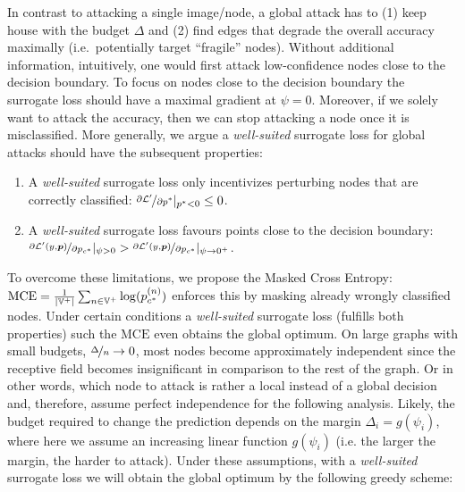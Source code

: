 \documentclass[sigconf, review]{acmart}
\begin{document}

In contrast to attacking a single image/node, a global attack has to (1) keep house with the budget \(\Delta\) and (2) find edges that degrade the overall accuracy maximally (i.e.\ potentially target ``fragile'' nodes). Without additional information, intuitively, one would first attack low-confidence nodes close to the decision boundary. To focus on nodes close to the decision boundary the surrogate loss should have a maximal gradient at \(\psi = 0\). Moreover, if we solely want to attack the accuracy, then we can stop attacking a node once it is misclassified. More generally, we argue a \emph{well-suited} surrogate loss for global attacks should have the subsequent properties:
\begin{enumerate}
    \item  A \emph{well-suited} surrogate loss only incentivizes perturbing nodes that are correctly classified: \(\nicefrac{\partial \mathcal{L}'}{\partial p^*} |_{p^* < 0} \le 0\).
    \item  A \emph{well-suited} surrogate loss favours points close to the decision boundary: \(\nicefrac{\partial \mathcal{L}'(y, {\bm{p}})}{\partial {p}_{c^*}} |_{\psi > 0}  > \nicefrac{\partial \mathcal{L}'(y, {\bm{p}})}{\partial {p}_{c^*}} |_{\psi \to 0^+}\).
\end{enumerate}

To overcome these limitations, we propose the Masked Cross Entropy: \(\text{MCE} = \frac{1}{|{\mathbb{V}}^+|} \sum_{n \in {\mathbb{V}}^+} \log({p}_{c^*}^{(n)})\) enforces this by masking already wrongly classified nodes.
Under certain conditions a \emph{well-suited} surrogate loss (fulfills both properties) such the \(\text{MCE}\) even obtains the global optimum. On large graphs with small budgets, \(\nicefrac{\Delta}{n} \to 0\), most nodes become approximately independent since the receptive field becomes insignificant in comparison to the rest of the graph. Or in other words, which node to attack is rather a local instead of a global decision and, therefore, assume perfect independence for the following analysis.
Likely, the budget required to change the prediction depends on the margin \(\Delta_i = g(\psi_i)\), where here we assume an increasing linear function \(g(\psi_i)\) (i.e. the larger the margin, the harder to attack). 
Under these assumptions, with a \emph{well-suited} surrogate loss we will obtain the global optimum by the following greedy scheme:
\end{document}

